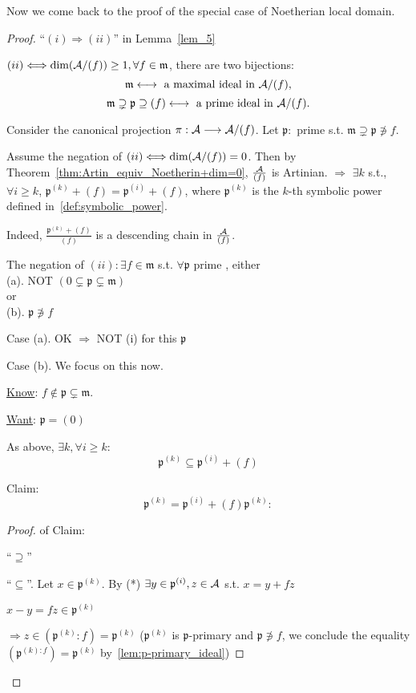 \documentclass[11pt]{article}
\newcommand{\scm}{{\mathfrak m}}
\newcommand{\scp}{{\mathfrak p}}
\newcommand{\cala}{{\cal A}}
\newcommand{\Lrta}{\Longrightarrow}
\newcommand{\lrta}{\longrightarrow}
\newcommand{\llrta}{\longleftrightarrow}
\newcommand{\Llrta}{\Longleftrightarrow}
\begin{document}
Now we come back to the proof of the special case of Noetherian local domain.
\begin{proof}
``$(i)\Lrta(ii)$'' in Lemma~\ref{lem_5}

$(ii)\Llrta \text{dim}(\cala/(f))\geq 1, \forall f\in\scm$, there are two bijections: 
$$
\scm\llrta \text{ a maximal ideal in }\cala/(f),
$$
$$
\scm\supsetneq\scp\supseteq(f)\llrta\text{ a prime ideal in }\cala/(f).
$$

Consider the canonical projection $\pi:\cala\lrta \cala/(f)$. Let $\scp:$ prime s.t. $\scm\supsetneq \scp\not \ni f$.

Assume the negation of $(ii)\Llrta \text{dim}(\cala/(f))=0$. Then by Theorem~\ref{thm:Artin_equiv_Noetherin+dim=0},
$\frac{\cala}{(f)}$ is  Artinian.  $\Lrta$ $\exists k$ s.t., $\forall i\geq k$, $\scp^{(k)}+(f)=\scp^{(i)}+(f)$, where $\scp^{(k)}$ is the $k$-th symbolic power defined in~\ref{def:symbolic_power}.

Indeed, $\frac{\scp^{(k)}+(f)}{(f)}$ is a descending chain in $\frac{\cala}{(f)}$.

The negation of $(ii):\exists f\in \scm$ s.t. $\forall \scp$ prime , either\\
(a). NOT $(0\subsetneq \scp\subsetneq\scm)$\\
or\\
(b). $\scp\not\ni f$

Case (a). OK $\Lrta $ NOT (i) for this $\scp$

Case (b). We focus on this now.

\underline{Know}: $f\notin \scp\subsetneq \scm$.

\underline{Want}: $\scp=(0)$

As above, $\exists k,\forall i\geq k$: 
\begin{equation}\tag{*}
\scp^{(k)}\subseteq\scp^{(i)}+(f)
\end{equation}

Claim:
\begin{equation}\tag{**}
\scp^{(k)}=\scp^{(i)}+(f)\scp^{(k)}:
\end{equation}
\begin{proof} of Claim:

``$\supseteq$'' \checkmark

``$\subseteq$''. Let $x\in\scp^{(k)}$. By (*) $\exists y\in\scp^{(i)},z\in\cala$ s.t. $x=y+fz$

$x-y=fz\in \scp^{(k)}$

$\Lrta z\in(\scp^{(k)}:f)=\scp^{(k)}$ ($\scp^{(k)}$ is $\scp$-primary and $\scp\not\ni f$, we conclude the equality $(\scp^{(k):f})=\scp^{(k)}$ by~\ref{lem:p-primary_ideal})


\end{proof}
\end{proof}
\end{document}
